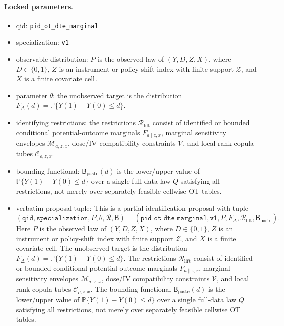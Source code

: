 \documentclass[11pt]{article}
\renewcommand{\Pr}{\mathbb{P}}
\theoremstyle{definition}
\theoremstyle{plain}
\theoremstyle{remark}
\begin{document}
\paragraph{Locked parameters.}
\begin{itemize}[leftmargin=*]
\item qid: \texttt{pid\_ot\_dte\_marginal}
\item specialization: \texttt{v1}
\item observable distribution: \(P\) is the observed law of \((Y,D,Z,X)\), where \(D\in\{0,1\}\), \(Z\) is an instrument or policy-shift index with finite support \(\mathcal Z\), and \(X\) is a finite covariate cell.
\item parameter \(\theta\): the unobserved target is the distribution \(F_\Delta(d)=\Pr\{Y(1)-Y(0)\le d\}\).
\item identifying restrictions: the restrictions \(\mathcal R_{\mathrm{lift}}\) consist of identified or bounded conditional potential-outcome marginals \(F_{a\mid z,x}\), marginal sensitivity envelopes \(\mathcal M_{a,z,x}\), dose/IV compatibility constraints \(\mathcal V\), and local rank-copula tubes \(\mathcal C_{\rho,z,x}\).
\item bounding functional: \(\mathsf B_{\mathrm{paste}}(d)\) is the lower/upper value of \(\Pr\{Y(1)-Y(0)\le d\}\) over a single full-data law \(Q\) satisfying all restrictions, not merely over separately feasible cellwise OT tables.
\item verbatim proposal tuple: This is a partial-identification proposal with tuple
\[
(\texttt{qid},\texttt{specialization},P,\theta,\mathcal R,\mathsf B)
=
(\texttt{pid\_ot\_dte\_marginal},\texttt{v1},P,F_\Delta,\mathcal R_{\mathrm{lift}},\mathsf B_{\mathrm{paste}}).
\]
Here \(P\) is the observed law of \((Y,D,Z,X)\), where \(D\in\{0,1\}\), \(Z\) is an instrument or policy-shift index with finite support \(\mathcal Z\), and \(X\) is a finite covariate cell.  The unobserved target is the distribution \(F_\Delta(d)=\Pr\{Y(1)-Y(0)\le d\}\).  The restrictions \(\mathcal R_{\mathrm{lift}}\) consist of identified or bounded conditional potential-outcome marginals \(F_{a\mid z,x}\), marginal sensitivity envelopes \(\mathcal M_{a,z,x}\), dose/IV compatibility constraints \(\mathcal V\), and local rank-copula tubes \(\mathcal C_{\rho,z,x}\).  The bounding functional \(\mathsf B_{\mathrm{paste}}(d)\) is the lower/upper value of \(\Pr\{Y(1)-Y(0)\le d\}\) over a single full-data law \(Q\) satisfying all restrictions, not merely over separately feasible cellwise OT tables.
\end{itemize}
\end{document}
